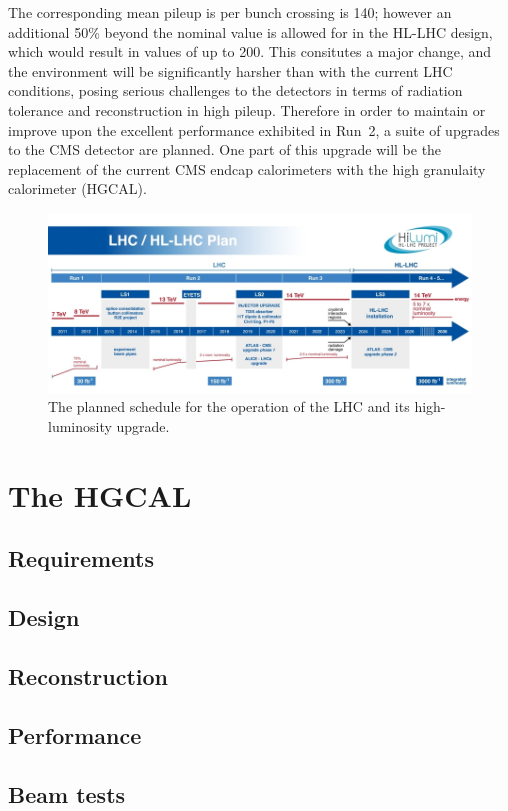 The corresponding mean pileup is per bunch crossing is 140; however an additional 50\% beyond the nominal value is allowed for in the HL-LHC design, 
which would result in values of up to 200.
This consitutes a major change, and the environment will be significantly harsher than with the current LHC conditions, 
posing serious challenges to the detectors in terms of radiation tolerance and reconstruction in high pileup.
Therefore in order to maintain or improve upon the excellent performance exhibited in Run~2, a suite of upgrades to the CMS detector are planned.
One part of this upgrade will be the replacement of the current CMS endcap calorimeters with the high granulaity calorimeter (HGCAL).

\begin{figure}[h!]
  \centering
  \includegraphics[width=\textwidth]{Figures/HGCAL/LHCschedule.jpg}
  \caption[Planned LHC and HL-LHC schedule]
  {The planned schedule for the operation of the LHC and its high-luminosity upgrade.}
  \label{fig:hgcal_LHCschedule}
\end{figure}


\section{The HGCAL}
\subsection{Requirements}
\subsection{Design}
\subsection{Reconstruction}
\subsection{Performance}
\subsection{Beam tests}
